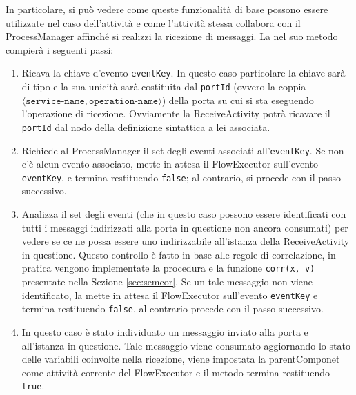 
In particolare, si può vedere come queste funzionalità di base possono essere
utilizzate nel caso dell'attività  e come
l'attività stessa collabora con il ProcessManager affinché si realizzi la
ricezione di messaggi. La  nel suo metodo
 compierà i seguenti passi:

\begin{enumerate}
  \item Ricava la chiave d'evento \texttt{eventKey}. In questo caso
  particolare la chiave sarà di tipo  e la sua
  unicità sarà costituita dal \texttt{portId} (ovvero la coppia 
  $\langle \texttt{service-name}, \texttt{operation-name} \rangle$) della porta
  su cui si sta eseguendo l'operazione di ricezione. Ovviamente la 
  ReceiveActivity potrà ricavare il \texttt{portId} dal nodo della definizione sintattica a lei associata.
  
  \item Richiede al ProcessManager il set degli eventi associati
  all'\texttt{eventKey}. Se non c'è alcun evento associato, mette in attesa il
  FlowExecutor sull'evento \texttt{eventKey}, e termina restituendo
  \texttt{false}; al contrario, si procede con il passo successivo.
  
  \item Analizza il set degli eventi (che in questo caso possono essere
  identificati con tutti i messaggi indirizzati alla porta in questione non
  ancora consumati) per vedere se ce ne possa essere uno indirizzabile
  all'istanza della ReceiveActivity in questione. Questo controllo \`e fatto
  in base alle regole di correlazione, in pratica vengono implementate la
  procedura e la funzione \texttt{corr(x, v)} presentate nella Sezione
  \ref{sec:semcor}. Se un tale messaggio non viene identificato, la
   mette in attesa il FlowExecutor sull'evento
  \texttt{eventKey} e termina restituendo \texttt{false}, al contrario procede
  con il passo successivo.
  
  \item In questo caso è stato individuato un messaggio inviato alla porta e
  all'istanza in questione. Tale messaggio viene consumato aggiornando lo stato
  delle variabili coinvolte nella ricezione, viene impostata la parentComponet come attività
  corrente del FlowExecutor e il metodo termina restituendo \texttt{true}.
\end{enumerate}

